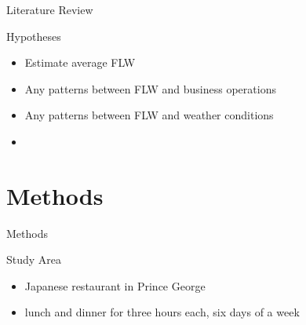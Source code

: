 \documentclass[
  ignorenonframetext,
]{beamer}
\providecommand{\tightlist}{%
  \setlength{\itemsep}{0pt}\setlength{\parskip}{0pt}}
\begin{document}
\begin{frame}{Literature Review}
\protect\hypertarget{literature-review-6}{}
\begin{block}{Hypotheses}
\protect\hypertarget{hypotheses}{}
\begin{itemize}
\tightlist
\item
  Estimate average FLW
\item
  Any patterns between FLW and business operations
\item
  Any patterns between FLW and weather conditions
\item
\end{itemize}
\end{block}
\end{frame}

\hypertarget{methods}{%
\section{Methods}\label{methods}}

\begin{frame}{Methods}
\protect\hypertarget{methods-1}{}
\begin{block}{Study Area}
\protect\hypertarget{study-area}{}
\begin{itemize}
\tightlist
\item
  Japanese restaurant in Prince George
\item
  lunch and dinner for three hours each, six days of a week
\end{itemize}
\end{block}
\end{frame}
\end{document}
